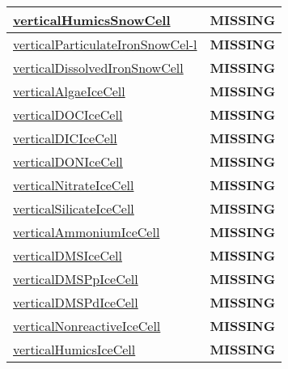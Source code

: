 {\begin{center}
\begin{longtable}{| p{2.0in} | p{4.0in} |}
    \hline
    \hyperref[subsec:var_sec_tracers_aggregate_verticalHumicsSnowCell]{verticalHumicsSnowCell} & {\bf \color{red} MISSING} \\
    \hline
    \hyperref[subsec:var_sec_tracers_aggregate_verticalParticulateIronSnowCell]{verticalParticulateIronSnowCel-}\hyperref[subsec:var_sec_tracers_aggregate_verticalParticulateIronSnowCell]{l  }& {\bf \color{red} MISSING} \\
    \hline
    \hyperref[subsec:var_sec_tracers_aggregate_verticalDissolvedIronSnowCell]{verticalDissolvedIronSnowCell} & {\bf \color{red} MISSING} \\
    \hline
    \hyperref[subsec:var_sec_tracers_aggregate_verticalAlgaeIceCell]{verticalAlgaeIceCell} & {\bf \color{red} MISSING} \\
    \hline
    \hyperref[subsec:var_sec_tracers_aggregate_verticalDOCIceCell]{verticalDOCIceCell} & {\bf \color{red} MISSING} \\
    \hline
    \hyperref[subsec:var_sec_tracers_aggregate_verticalDICIceCell]{verticalDICIceCell} & {\bf \color{red} MISSING} \\
    \hline
    \hyperref[subsec:var_sec_tracers_aggregate_verticalDONIceCell]{verticalDONIceCell} & {\bf \color{red} MISSING} \\
    \hline
    \hyperref[subsec:var_sec_tracers_aggregate_verticalNitrateIceCell]{verticalNitrateIceCell} & {\bf \color{red} MISSING} \\
    \hline
    \hyperref[subsec:var_sec_tracers_aggregate_verticalSilicateIceCell]{verticalSilicateIceCell} & {\bf \color{red} MISSING} \\
    \hline
    \hyperref[subsec:var_sec_tracers_aggregate_verticalAmmoniumIceCell]{verticalAmmoniumIceCell} & {\bf \color{red} MISSING} \\
    \hline
    \hyperref[subsec:var_sec_tracers_aggregate_verticalDMSIceCell]{verticalDMSIceCell} & {\bf \color{red} MISSING} \\
    \hline
    \hyperref[subsec:var_sec_tracers_aggregate_verticalDMSPpIceCell]{verticalDMSPpIceCell} & {\bf \color{red} MISSING} \\
    \hline
    \hyperref[subsec:var_sec_tracers_aggregate_verticalDMSPdIceCell]{verticalDMSPdIceCell} & {\bf \color{red} MISSING} \\
    \hline
    \hyperref[subsec:var_sec_tracers_aggregate_verticalNonreactiveIceCell]{verticalNonreactiveIceCell} & {\bf \color{red} MISSING} \\
    \hline
    \hyperref[subsec:var_sec_tracers_aggregate_verticalHumicsIceCell]{verticalHumicsIceCell} & {\bf \color{red} MISSING} \\

\end{longtable}
\end{center}}

